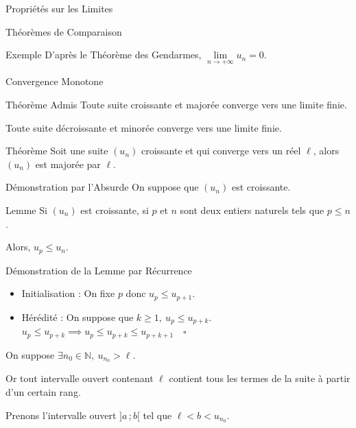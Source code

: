 \documentclass{coursbook}
\begin{document}
\begin{Gpartie}{Propriétés sur les Limites}
\begin{Spartie}{Théorèmes de Comparaison}
\begin{SSpartie}{Exemple}
                D'après le Théorème des Gendarmes, $\lim\limits_{n\to +\infty}u_n=0$.
            \end{SSpartie}
        \end{Spartie}
        \pagebreak
        \begin{Spartie}{Convergence Monotone} 
            \begin{SSpartie}{Théorème Admis} 
                Toute suite croissante et majorée converge vers une limite finie.

                Toute suite décroissante et minorée converge vers une limite finie.
            \end{SSpartie}
            \begin{SSpartie}{Théorème} 
                Soit une suite $(u_n)$ croissante et qui converge vers un réel $\ell$, alors $(u_n)$ est majorée par $\ell$.
                \begin{SSSpartie}{Démonstration par l'Absurde} 
                    On suppose que $(u_n)$ est croissante.
                    \begin{SSSSpartie}{Lemme} 
                        Si $(u_n)$ est croissante, si $p$ et $n$ sont deux entiers naturels tels que $p\leq n$.

                        Alors, $u_p\leq u_n$.
                    \end{SSSSpartie}
                    \begin{SSSSpartie}{Démonstration de la Lemme par Récurrence}
                        \vspace{-1em}
                        \begin{itemize}
                            \item Initialisation : On fixe $p$ donc $u_p\leq u_{p+1}$.
                            \item Hérédité : On suppose que $k\geq 1,\ u_p\leq u_{p+k}$. \\
                            \phantom{Hérédité : }$u_p\leq u_{p+k}\implies u_p\leq u_{p+k}\leq u_{p+k+1}\quad\square$
                        \end{itemize}   
                    \end{SSSSpartie}
                    On suppose $\exists n_0\in\mathbb{N},\ u_{n_0}>\ell$.

                    Or tout intervalle ouvert contenant $\ell$ contient tous les termes de la suite à partir d'un certain rang.

                    Prenons l'intervalle ouvert $\big]a\,; b\big[$ tel que $\ell<b<u_{n_0}$.


\end{SSSpartie}
\end{SSpartie}
\end{Spartie}
\end{Gpartie}
\end{document}
